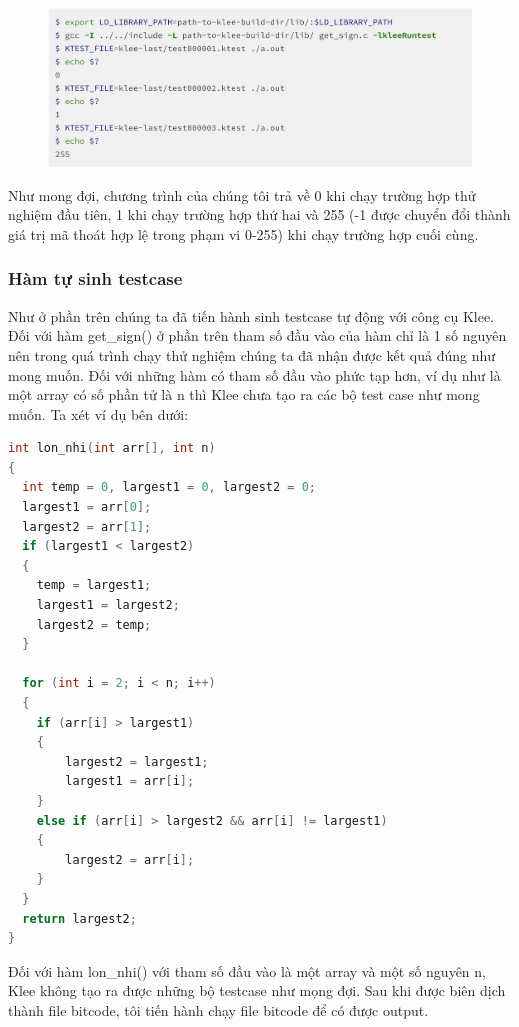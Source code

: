 \documentclass[12pt,a4paper]{article}
\begin{document}
\begin{figure}[ht]
\begin{center}
\includegraphics[scale=.3]{hinhanh/replayingtestcase.png}
\end{center}
\end{figure}

Như mong đợi, chương trình của chúng tôi trả về 0 khi chạy trường hợp thử nghiệm đầu tiên, 1 khi chạy trường hợp thứ hai và 255 (-1 được chuyển đổi thành giá trị mã thoát hợp lệ trong phạm vi 0-255) khi chạy trường hợp cuối cùng.

\subsubsection{Hàm tự sinh testcase}
Như ở phần trên chúng ta đã tiến hành sinh testcase tự động với công cụ Klee. Đối với hàm get\_sign() ở phần trên tham số đầu vào của hàm chỉ là 1 số nguyên nên trong quá trình chạy thử nghiệm chúng ta đã nhận được kết quả đúng như mong muốn.  Đối với những hàm có tham số đầu vào phức tạp hơn, ví dụ như là một array có số phần tử là n thì Klee chưa tạo ra các bộ test case như  mong muốn. Ta xét ví dụ bên dưới:

\begin{lstlisting}[language=c]
int lon_nhi(int arr[], int n)
{
  int temp = 0, largest1 = 0, largest2 = 0;
  largest1 = arr[0];
  largest2 = arr[1];
  if (largest1 < largest2)
  { 
    temp = largest1;
    largest1 = largest2;
    largest2 = temp;
  }
  
  for (int i = 2; i < n; i++)
  { 
    if (arr[i] > largest1)
    {   
        largest2 = largest1;
        largest1 = arr[i];
    }
    else if (arr[i] > largest2 && arr[i] != largest1)
    {   
        largest2 = arr[i];
    }
  }
  return largest2;
}
\end{lstlisting}

Đối với hàm lon\_nhi() với tham số đầu vào là một array và một số nguyên n, Klee không tạo ra được những bộ testcase như mọng đợi. Sau khi được biên dịch thành file bitcode, tôi tiến hành chạy file bitcode để có được output.
\end{document}
